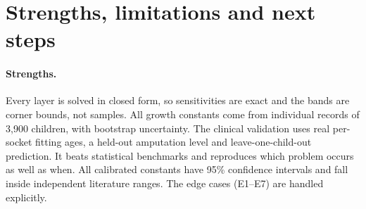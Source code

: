 \documentclass[11pt]{article}
\theoremstyle{definition}
\begin{document}
\section{Strengths, limitations and next steps}
\paragraph{Strengths.} Every layer is solved in closed form, so sensitivities are exact and the bands are corner bounds, not samples. All growth constants come from individual records of 3,900 children, with bootstrap uncertainty. The clinical validation uses real per-socket fitting ages, a held-out amputation level and leave-one-child-out prediction. It beats statistical benchmarks and reproduces which problem occurs as well as when. All calibrated constants have 95\% confidence intervals and fall inside independent literature ranges. The edge cases (E1--E7) are handled explicitly.
\end{document}
